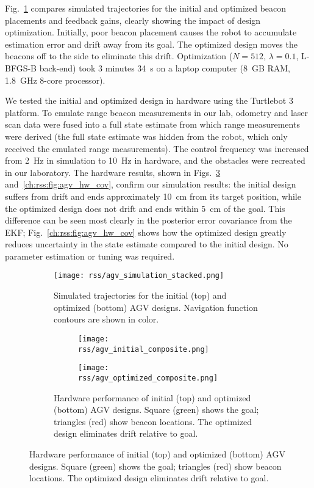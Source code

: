 Fig.~\ref{ch:rss:fig:agv_representative_trajectories} compares simulated trajectories for the initial and optimized beacon placements and feedback gains, clearly showing the impact of design optimization. Initially, poor beacon placement causes the robot to accumulate estimation error and drift away from its goal. The optimized design moves the beacons off to the side to eliminate this drift. Optimization ($N=512$, $\lambda=0.1$, L-BFGS-B back-end) took 3 minutes \SI{34}{s} on a laptop computer (\SI{8}{GB} RAM, \SI{1.8}{GHz} 8-core processor).

We tested the initial and optimized design in hardware using the Turtlebot 3 platform. To emulate range beacon measurements in our lab, odometry and laser scan data were fused into a full state estimate from which range measurements were derived (the full state estimate was hidden from the robot, which only received the emulated range measurements). The control frequency was increased from \SI{2}{Hz} in simulation to \SI{10}{Hz} in hardware, and the obstacles were recreated in our laboratory. The hardware results, shown in Figs.~\ref{ch:rss:fig:agv_hw} and~\ref{ch:rss:fig:agv_hw_cov}, confirm our simulation results: the initial design suffers from drift and ends approximately \SI{10}{cm} from its target position, while the optimized design does not drift and ends within \SI{5}{cm} of the goal. This difference can be seen most clearly in the posterior error covariance from the EKF;  Fig.~\ref{ch:rss:fig:agv_hw_cov} shows how the optimized design greatly reduces uncertainty in the state estimate compared to the initial design. No parameter estimation or tuning was required.

\begin{figure}[tb]
    \centering
    \begin{subfigure}[c]{0.45\linewidth}
        \centering
        \texttt{[image: rss/agv\_simulation\_stacked.png]}
        \caption{Simulated trajectories for the initial (top) and optimized (bottom) AGV designs. Navigation function contours are shown in color.}
        \label{ch:rss:fig:agv_representative_trajectories}
    \end{subfigure}
    \quad
    \begin{subfigure}[c]{0.45\linewidth}
        \begin{subfigure}[t]{\linewidth}
            \centering
            \texttt{[image: rss/agv\_initial\_composite.png]}
        \end{subfigure}

        \begin{subfigure}[t]{\linewidth}
            \centering
            \texttt{[image: rss/agv\_optimized\_composite.png]}
        \end{subfigure}
        \caption{Hardware performance of initial (top) and optimized (bottom) AGV designs. Square (green) shows the goal; triangles (red) show beacon locations. The optimized design eliminates drift relative to goal.}
        \label{ch:rss:fig:agv_hw}
    \end{subfigure}
\end{figure}

